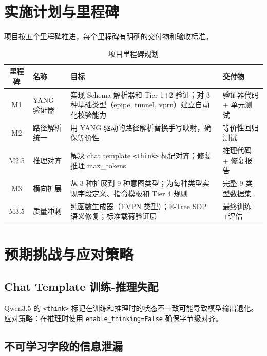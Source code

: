 \documentclass[12pt, a4paper]{article}
\begin{document}
\section{实施计划与里程碑}
\label{sec:milestones}

项目按五个里程碑推进，每个里程碑有明确的交付物和验收标准。

\begin{table}[H]
\centering
\caption{项目里程碑规划}
\label{tab:milestones}
\small
\begin{tabular}{clp{7cm}l}
\toprule
\textbf{里程碑} & \textbf{名称} & \textbf{目标} & \textbf{交付物} \\
\midrule
M1 & YANG 验证器 &
  实现 Schema 解析器和 Tier 1+2 验证；对 3 种基础类型（epipe, tunnel, vprn）建立自动化校验能力 &
  验证器代码 + 单元测试 \\
\addlinespace
M2 & 路径解析统一 &
  用 YANG 驱动的路径解析替换手写映射，确保等价性 &
  等价性回归测试 \\
\addlinespace
M2.5 & 推理对齐 &
  解决 chat template \texttt{<think>} 标记对齐；修复推理 max\_tokens &
  推理代码 + 修复报告 \\
\addlinespace
M3 & 横向扩展 &
  从 3 种扩展到 9 种意图类型；为每种类型实现字段定义、指令模板和 Tier 4 规则 &
  完整 9 类型数据集 \\
\addlinespace
M3.5 & 质量冲刺 &
  纯函数生成器（EVPN 类型）；E-Tree SDP 语义修复；标准载荷验证层 &
  最终训练+评估 \\
\bottomrule
\end{tabular}
\end{table}

\section{预期挑战与应对策略}
\label{sec:challenges}

\subsection{Chat Template 训练-推理失配}

Qwen3.5 的 \texttt{<think>} 标记在训练和推理时的状态不一致可能导致模型输出退化。应对策略：在推理时使用 \texttt{enable\_thinking=False} 确保字节级对齐。

\subsection{不可学习字段的信息泄漏}
\end{document}
